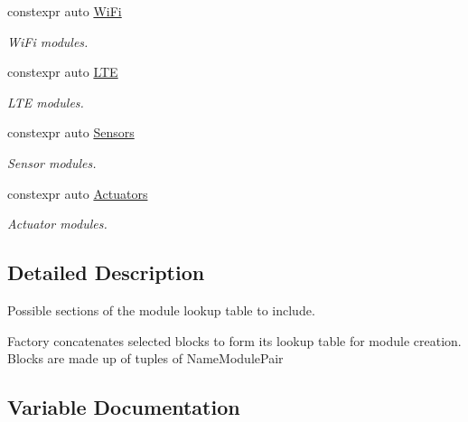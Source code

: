 \begin{DoxyCompactItemize}
constexpr auto \hyperlink{namespace_include_a6cf33ac8efc6a5092ce9a6af9cf02d36}{Wi\+Fi}
\begin{DoxyCompactList}\small\item\em Wi\+Fi modules. \end{DoxyCompactList}\item 
constexpr auto \hyperlink{namespace_include_a8d54cbf6e38dd18378d1fbce77da979e}{L\+TE}
\begin{DoxyCompactList}\small\item\em L\+TE modules. \end{DoxyCompactList}\item 
constexpr auto \hyperlink{namespace_include_afdc5a0bd51655ca57718cdca40e5b277}{Sensors}
\begin{DoxyCompactList}\small\item\em Sensor modules. \end{DoxyCompactList}\item 
constexpr auto \hyperlink{namespace_include_a40e108fcc93c3c148487421aedb9a250}{Actuators}
\begin{DoxyCompactList}\small\item\em Actuator modules. \end{DoxyCompactList}\end{DoxyCompactItemize}


\subsection{Detailed Description}
Possible sections of the module lookup table to include. 

Factory concatenates selected blocks to form its lookup table for module creation. Blocks are made up of tuples of Name\+Module\+Pair 

\subsection{Variable Documentation}
